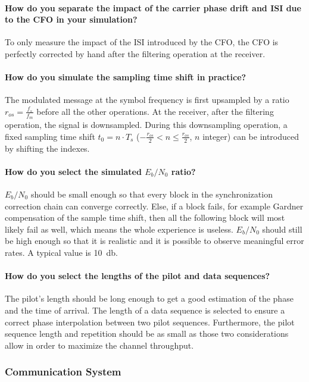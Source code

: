 \paragraph{How do you separate the impact of the carrier phase drift and ISI due to the CFO in your simulation?}
To only measure the impact of the ISI introduced by the CFO, the CFO is perfectly corrected by hand after the filtering operation at the receiver.

\paragraph{How do you simulate the sampling time shift in practice?}The modulated message at the symbol frequency is first upsampled by a ratio $r_{os} = \frac{f_s}{f_m}$ before all the other operations.
At the receiver, after the filtering operation, the signal is downsampled.
During this downsampling operation, a fixed sampling time shift $t_0 = n \cdot T_s$ ($-\frac{r_{os}}{2} < n \leq \frac{r_{os}}{2}$, $n$ integer) can be introduced by shifting the indexes.

\paragraph{How do you select the simulated $E_{b}/N_{0}$ ratio?} $E_{b}/N_{0}$ should be small enough so that every block in the synchronization correction chain can converge correctly.
Else, if a block fails, for example Gardner compensation of the sample time shift, then all the following block will most likely fail as well, which means the whole experience is useless.
$E_{b}/N_{0}$ should still be high enough so that it is realistic and it is possible to observe meaningful error rates.
A typical value is \SI{10}{\decibel}.

\paragraph{How do you select the lengths of the pilot and data sequences?} The pilot's length should be long enough to get a good estimation of the phase and the time of arrival.
The length of a data sequence is selected to ensure a correct phase interpolation between two pilot sequences.
Furthermore, the pilot sequence length and repetition should be as small as those two considerations allow in order to maximize the channel throughput.

\subsubsection{Communication System}

